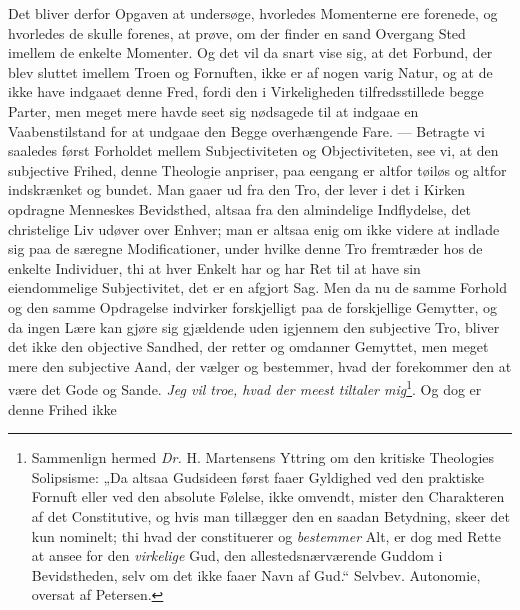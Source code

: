 \documentclass[12pt]{book}
\newcommand{\opage}[1]{\marginnote{\footnotesize\textit{[#1]}}}
\begin{document}
Det bliver derfor Opgaven at undersøge, hvorledes Momenterne ere forenede, og
hvorledes de skulle forenes, at prøve, om der finder en sand Overgang Sted
imellem de enkelte Momenter. Og det vil da snart vise sig, at det Forbund, der
blev sluttet imellem Troen og Fornuften, ikke er af nogen varig Natur, og at
de ikke have indgaaet denne Fred, fordi den i Virkeligheden tilfredsstillede
begge Parter, men meget mere havde seet sig nødsagede til at indgaae en
Vaabenstilstand for at undgaae den Begge overhængende Fare. --- Betragte vi
saaledes først Forholdet mellem Subjectiviteten og Objectiviteten, see vi, at
den subjective Frihed, denne Theologie anpriser, paa eengang er altfor tøiløs
og altfor indskrænket og bundet. Man gaaer ud fra den Tro, der lever i det i
Kirken opdragne Menneskes Bevidsthed, altsaa fra den almindelige Indflydelse,
det christelige Liv udøver over Enhver; man er altsaa enig om ikke videre at
indlade sig paa de særegne Modificationer, under hvilke denne Tro fremtræder
hos de enkelte Individuer, thi at hver Enkelt har og har Ret til at have sin
eiendommelige Subjectivitet, det er en afgjort Sag. Men da nu de samme Forhold
og den samme Opdragelse indvirker forskjelligt paa de forskjellige Gemytter,
og da ingen Lære kan gjøre sig gjældende uden igjennem den subjective Tro,
bliver det ikke den objective Sandhed, der retter og omdanner Gemyttet, men
meget mere den subjective Aand, der vælger og bestemmer, hvad der forekommer
den at være det Gode og Sande. \emph{Jeg vil troe, hvad der meest tiltaler
\opage{106} \setcounter{footnote}{0}%
mig}\footnote{Sammenlign hermed \textit{Dr.} H. Martensens Yttring om den
kritiske Theologies Solipsisme: „Da altsaa Gudsideen først faaer Gyldighed ved
den praktiske Fornuft eller ved den absolute Følelse, ikke omvendt, mister den
Charakteren af det Constitutive, og hvis man tillægger den en saadan
Betydning, skeer det kun nominelt; thi hvad der constituerer og
\emph{bestemmer} Alt, er dog med Rette at ansee for den \emph{virkelige} Gud,
den allestedsnærværende Guddom i Bevidstheden, selv om det ikke faaer Navn af
Gud.“ Selvbev. Autonomie, oversat af Petersen.}. Og dog er denne Frihed ikke
\end{document}
